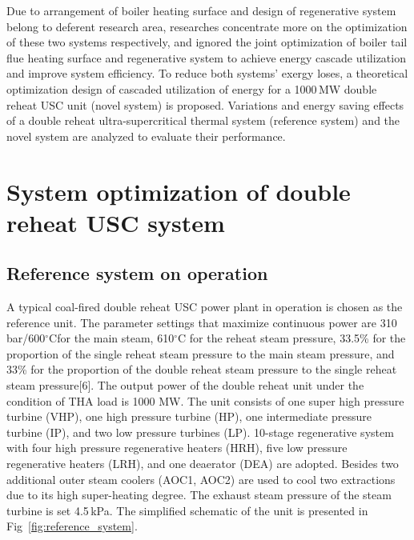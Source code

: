 \documentclass[preprint,12pt]{elsarticle}
\begin{document}
Due to arrangement of boiler heating surface and design of regenerative system belong to deferent research area, researches concentrate more on the optimization of these two systems respectively, and ignored the joint optimization of boiler tail flue heating surface and regenerative system to achieve energy cascade utilization and improve system efficiency.
To reduce both systems' exergy loses, a theoretical optimization design of cascaded utilization of energy for a 1000\,MW double reheat USC unit (novel system) is proposed. Variations and energy saving effects of a double reheat ultra-supercritical thermal system (reference system) and the novel system are analyzed to evaluate their performance. 

\section{System optimization of double reheat USC system}
\label{sec2:system intro}
\subsection{Reference system on operation} %
\label{sub2:ref intro}
A typical coal-fired double reheat USC power plant in operation is chosen as the reference unit.
The parameter settings that maximize continuous power are 310\,bar/600$^\circ$Cfor the main steam, 610$^\circ$C for the reheat steam pressure, 33.5\% for the proportion of the single reheat steam pressure to the main steam pressure, and 33\% for the proportion of the double reheat steam pressure to the single reheat steam pressure[6].
The output power of the double reheat unit under the condition of THA load is 1000 MW.
The unit consists of one super high pressure turbine (VHP), one high pressure turbine (HP), one intermediate pressure turbine (IP), and two low pressure turbines (LP).
10-stage regenerative system with four high pressure regenerative heaters (HRH), five low pressure regenerative heaters (LRH), and one deaerator (DEA) are adopted.
Besides two additional outer steam coolers (AOC1, AOC2) are used to cool two extractions due to its high super-heating degree. The exhaust steam pressure of the steam turbine is set 4.5\,kPa. The simplified schematic of the unit is presented in Fig~\ref{fig:reference_system}.
\end{document}
